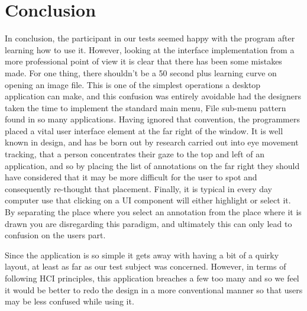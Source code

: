 \section{Conclusion}

In conclusion, the participant in our tests seemed happy with the program after learning how to use it.  However, looking at the interface implementation from a more professional point of view it is clear that there has been some mistakes made.  For one thing, there shouldn’t be a 50 second plus learning curve on opening an image file.  This is one of the simplest operations a desktop application can make, and this confusion was entirely avoidable had the designers taken the time to implement the standard main menu, File sub-menu pattern found in so many applications.  Having ignored that convention, the programmers placed a vital user interface element at the far right of the window.  It is well known in design, and has be born out by research carried out into eye movement tracking, that a person concentrates their gaze to the top and left of an application, and so by placing the list of annotations on the far right they should have considered that it may be more difficult for the user to spot and consequently re-thought that placement.  Finally, it is typical in every day computer use that clicking on a UI component will either highlight or select it.  By separating the place where you select an annotation from the place where it is drawn you are disregarding this paradigm, and ultimately this can only lead to confusion on the users part.

Since the application is so simple it gets away with having a bit of a quirky layout, at least as far as our test subject was concerned.  However, in terms of following HCI principles, this application breaches a few too many and so we feel it would be better to redo the design in a more conventional manner so that users may be less confused while using it.
